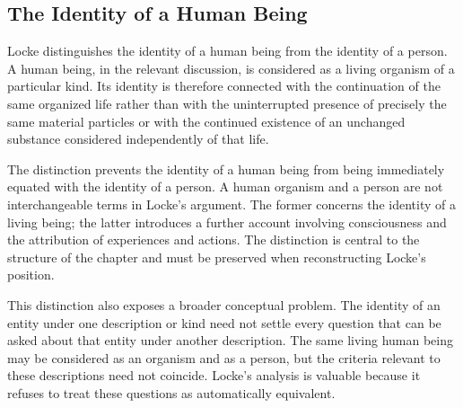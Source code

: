 
\subsection{The Identity of a Human Being}
\label{subsec:ch08-locke-human-being}

\label{para:VS.B01.P01.C08.S08.SS06.P001}

Locke distinguishes the identity of a human being
from the identity of a person. A human being, in
the relevant discussion, is considered as a living
organism of a particular kind. Its identity is
therefore connected with the continuation of the
same organized life rather than with the uninterrupted
presence of precisely the same material particles
or with the continued existence of an unchanged
substance considered independently of that life.
\cite[II.xxvii.6--8]{LockeEssay}

\label{para:VS.B01.P01.C08.S08.SS06.P002}

The distinction prevents the identity of a human
being from being immediately equated with the
identity of a person. A human organism and a person
are not interchangeable terms in Locke's argument.
The former concerns the identity of a living being;
the latter introduces a further account involving
consciousness and the attribution of experiences
and actions. The distinction is central to the
structure of the chapter and must be preserved
when reconstructing Locke's position.

\label{para:VS.B01.P01.C08.S08.SS06.P003}

This distinction also exposes a broader conceptual
problem. The identity of an entity under one
description or kind need not settle every question
that can be asked about that entity under another
description. The same living human being may be
considered as an organism and as a person, but
the criteria relevant to these descriptions need
not coincide. Locke's analysis is valuable because
it refuses to treat these questions as automatically
equivalent.

\label{para:VS.B01.P01.C08.S08.SS06.P004}

